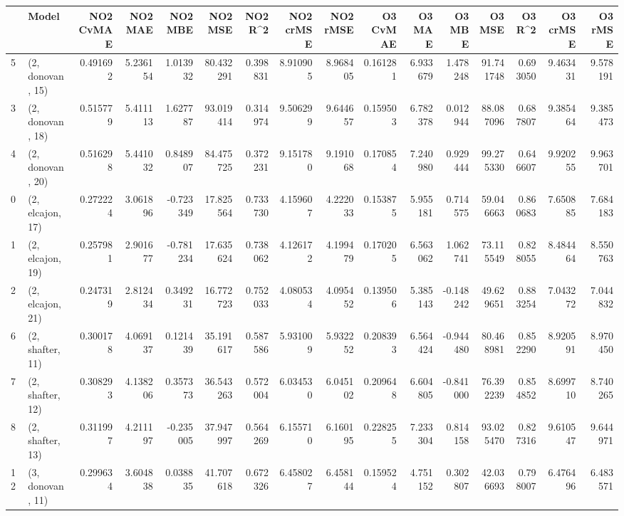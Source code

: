 \begin{tabular}{llrrrrrrrrrrrrrr}
\toprule
{} &             Model &  NO2 CvMAE &   NO2 MAE &   NO2 MBE &    NO2 MSE &   NO2 R\textasciicircum2 &  NO2 crMSE &  NO2 rMSE &  O3 CvMAE &     O3 MAE &    O3 MBE &      O3 MSE &    O3 R\textasciicircum2 &   O3 crMSE &    O3 rMSE \\
\midrule
5  &  (2, donovan, 15) &   0.491692 &  5.236154 &  1.013932 &  80.432291 &  0.398831 &   8.910905 &  8.968405 &  0.161281 &   6.933679 &  1.478248 &   91.741748 &  0.693050 &   9.463431 &   9.578191 \\
3  &  (2, donovan, 18) &   0.515779 &  5.411113 &  1.627787 &  93.019414 &  0.314974 &   9.506299 &  9.644657 &  0.159503 &   6.782378 &  0.012944 &   88.087096 &  0.687807 &   9.385464 &   9.385473 \\
4  &  (2, donovan, 20) &   0.516298 &  5.441032 &  0.848907 &  84.475725 &  0.372231 &   9.151780 &  9.191068 &  0.170854 &   7.240980 &  0.929444 &   99.275330 &  0.646607 &   9.920255 &   9.963701 \\
0  &  (2, elcajon, 17) &   0.272224 &  3.061896 & -0.723349 &  17.825564 &  0.733730 &   4.159607 &  4.222033 &  0.153875 &   5.955181 &  0.714575 &   59.046663 &  0.860683 &   7.650885 &   7.684183 \\
1  &  (2, elcajon, 19) &   0.257981 &  2.901677 & -0.781234 &  17.635624 &  0.738062 &   4.126172 &  4.199479 &  0.170205 &   6.563062 &  1.062741 &   73.115549 &  0.828055 &   8.484464 &   8.550763 \\
2  &  (2, elcajon, 21) &   0.247319 &  2.812434 &  0.349231 &  16.772723 &  0.752033 &   4.080534 &  4.095452 &  0.139506 &   5.385143 & -0.148242 &   49.629651 &  0.883254 &   7.043272 &   7.044832 \\
6  &  (2, shafter, 11) &   0.300178 &  4.069137 &  0.121439 &  35.191617 &  0.587586 &   5.931009 &  5.932252 &  0.208393 &   6.564424 & -0.944480 &   80.468981 &  0.852290 &   8.920591 &   8.970450 \\
7  &  (2, shafter, 12) &   0.308293 &  4.138206 &  0.357373 &  36.543263 &  0.572004 &   6.034530 &  6.045102 &  0.209648 &   6.604805 & -0.841000 &   76.392239 &  0.854852 &   8.699710 &   8.740265 \\
8  &  (2, shafter, 13) &   0.311997 &  4.211197 & -0.235005 &  37.947997 &  0.564269 &   6.155710 &  6.160195 &  0.228255 &   7.233304 &  0.814158 &   93.025470 &  0.827316 &   9.610547 &   9.644971 \\
12 &  (3, donovan, 11) &   0.299634 &  3.604838 &  0.038835 &  41.707618 &  0.672326 &   6.458027 &  6.458144 &  0.159524 &   4.751152 &  0.302807 &   42.036693 &  0.798007 &   6.476496 &   6.483571 \\

\end{tabular}

